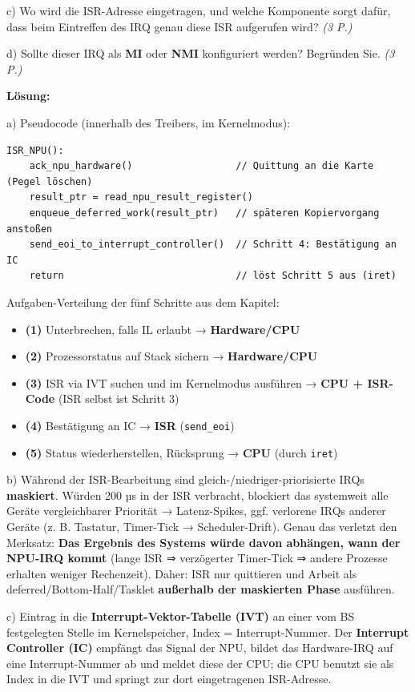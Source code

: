 \documentclass[11pt, a4paper]{article}
\begin{document}
c) Wo wird die ISR-Adresse eingetragen, und welche Komponente sorgt dafür, dass beim Eintreffen des IRQ genau diese ISR aufgerufen wird? \textit{(3 P.)}


d) Sollte dieser IRQ als \textbf{MI} oder \textbf{NMI} konfiguriert werden? Begründen Sie. \textit{(3 P.)}


\textbf{Lösung:}


a) Pseudocode (innerhalb des Treibers, im Kernelmodus):


\begin{lstlisting}
ISR_NPU():
    ack_npu_hardware()                  // Quittung an die Karte (Pegel löschen)
    result_ptr = read_npu_result_register()
    enqueue_deferred_work(result_ptr)   // späteren Kopiervorgang anstoßen
    send_eoi_to_interrupt_controller()  // Schritt 4: Bestätigung an IC
    return                              // löst Schritt 5 aus (iret)
\end{lstlisting}


Aufgaben-Verteilung der fünf Schritte aus dem Kapitel:

\begin{itemize}
  \item \textbf{(1)} Unterbrechen, falls IL erlaubt → \textbf{Hardware/CPU}
  \item \textbf{(2)} Prozessorstatus auf Stack sichern → \textbf{Hardware/CPU}
  \item \textbf{(3)} ISR via IVT suchen und im Kernelmodus ausführen → \textbf{CPU + ISR-Code} (ISR selbst ist Schritt 3)
  \item \textbf{(4)} Bestätigung an IC → \textbf{ISR} (\texttt{send\_eoi})
  \item \textbf{(5)} Status wiederherstellen, Rücksprung → \textbf{CPU} (durch \texttt{iret})
\end{itemize}

b) Während der ISR-Bearbeitung sind gleich-/niedriger-priorisierte IRQs \textbf{maskiert}. Würden 200 µs in der ISR verbracht, blockiert das systemweit alle Geräte vergleichbarer Priorität → Latenz-Spikes, ggf. verlorene IRQs anderer Geräte (z. B. Tastatur, Timer-Tick → Scheduler-Drift). Genau das verletzt den Merksatz: \textbf{Das Ergebnis des Systems würde davon abhängen, wann der NPU-IRQ kommt} (lange ISR ⇒ verzögerter Timer-Tick ⇒ andere Prozesse erhalten weniger Rechenzeit). Daher: ISR nur quittieren und Arbeit als deferred/Bottom-Half/Tasklet \textbf{außerhalb der maskierten Phase} ausführen.


c) Eintrag in die \textbf{Interrupt-Vektor-Tabelle (IVT)} an einer vom BS festgelegten Stelle im Kernelspeicher, Index = Interrupt-Nummer. Der \textbf{Interrupt Controller (IC)} empfängt das Signal der NPU, bildet das Hardware-IRQ auf eine Interrupt-Nummer ab und meldet diese der CPU; die CPU benutzt sie als Index in die IVT und springt zur dort eingetragenen ISR-Adresse.
\end{document}
